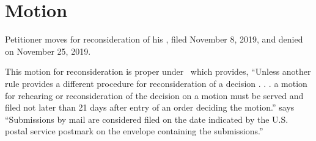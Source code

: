 \documentclass[12pt,\documentclassflag]{michiganCourtOfAppealsBrief}
\begin{document}


\section{Motion}

Petitioner moves for reconsideration of his \cite[s]{Motion}, filed November 8, 2019, and denied on November 25, 2019. 

This motion for reconsideration is proper under \cite[s]{MCR 2.119(F)(1)}\ which provides, ``Unless another rule provides a different procedure for reconsideration of a decision . . . a motion for rehearing or reconsideration of the decision on a motion must be served and filed not later than 21 days after entry of an order deciding the motion.''
\cite{TTR 219(5)} says ``Submissions by mail are considered filed on the date indicated by the U.S. postal service postmark on the envelope containing the submissions.'' 




\end{document}
